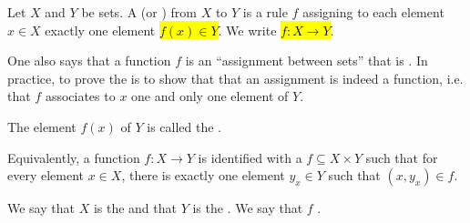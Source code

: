 \begin{definition} \label{definition:function_of_sets}
Let $X$ and $Y$ be sets. A  (or ) from $X$ to $Y$ is a rule $f$ assigning to each element $x \in X$ exactly one element \hl{$f(x) \in Y$}. We write \hl{$f : X \to Y$}. 

One also says that a function $f$ is an ``assignment between sets'' that is . In practice, to prove the  is to show that that an assignment is indeed a function, i.e. that $f$ associates to $x$ one and only one element of $Y$.

The element $f(x)$ of $Y$ is called the .

Equivalently, a function $f: X \to Y$ is identified with a  $f \subseteq X \times Y$ such that for every element $x \in X$, there is exactly one element $y_x \in Y$ such that $(x,y_x) \in f$. 


We say that $X$ is the  and that $Y$ is the . We say that $f$ .


\end{definition}